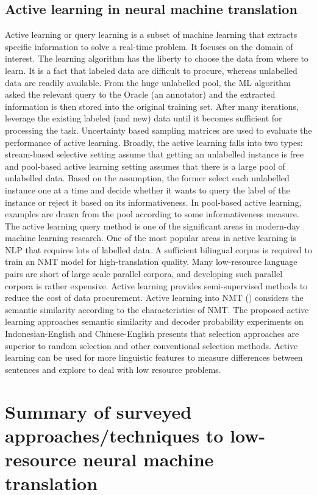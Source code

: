 \documentclass[manuscript,screen]{acmart}
\begin{document}
\subsection{Active learning in neural machine translation}
Active learning or query learning is a subset of machine learning that extracts specific information to solve a real-time problem. It focuses on the domain of interest. The learning algorithm has the liberty to choose the data from where to learn. It is a fact that labeled data are difficult to procure, whereas unlabelled data are readily available.  From the huge unlabelled pool, the ML algorithm asked the relevant query to the Oracle (an annotator) and the extracted information is then stored into the original training set. After many iterations, leverage the existing labeled (and new) data until it becomes sufficient for processing the task. Uncertainty based sampling matrices are used to evaluate the performance of active learning. Broadly, the active learning falls into two types: stream-based selective setting assume that getting an unlabelled instance is free and pool-based active learning setting assumes that there is a large pool of unlabelled data. Based on the assumption, the former select each unlabelled instance one at a time and decide whether it wants to query the label of the instance or reject it based on its informativeness. In pool-based active learning, examples are drawn from the pool according to some informativeness measure. The active learning query method is one of the significant areas in modern-day machine learning research. One of the most popular areas in active learning is NLP that requires lots of labelled data. 
A sufficient bilingual corpus is required to train an NMT model for high-translation quality. Many low-resource language pairs are short of large scale parallel corpora, and developing such parallel corpora is rather expensive.
Active learning provides semi-supervised methods to reduce the cost of data procurement. Active learning into NMT (\citet{zhang2018active}) considers the semantic similarity according to the characteristics of NMT. The proposed active learning approaches semantic similarity and decoder probability experiments on Indonesian-English and Chinese-English presents that selection approaches are superior to random selection and other conventional selection methods.
Active learning can be used for more linguistic features to measure differences between sentences and explore to deal with low resource problems.

\section{Summary of surveyed approaches/techniques to low-resource neural machine translation}
\label{summarized}
\end{document}
